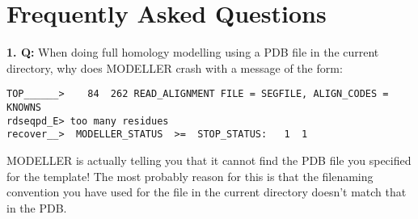 \documentclass[12pt]{article}
\begin{document}
\section{Frequently Asked Questions}

{\bfseries 1. Q:} When doing full homology modelling using a PDB file
in the current directory, why does MODELLER crash with a message of
the form:
\begin{verbatim}
TOP______>    84  262 READ_ALIGNMENT FILE = SEGFILE, ALIGN_CODES = KNOWNS
rdseqpd_E> too many residues
recover__>  MODELLER_STATUS  >=  STOP_STATUS:   1  1
\end{verbatim}

 MODELLER is actually telling you that it cannot find
the PDB file you specified for the template! The most probably reason
for this is that the filenaming convention you have used for the file
in the current directory doesn't match that in the PDB.
\vspace{1em}
\end{document}
